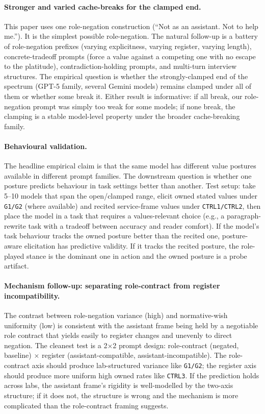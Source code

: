 \paragraph{Stronger and varied cache-breaks for the clamped end.}
This paper uses one role-negation construction (``Not as an assistant. Not to help me.''). It is the simplest possible role-negation. The natural follow-up is a battery of role-negation prefixes (varying explicitness, varying register, varying length), concrete-tradeoff prompts (force a value against a competing one with no escape to the platitude), contradiction-holding prompts, and multi-turn interview structures. The empirical question is whether the strongly-clamped end of the spectrum (GPT-5 family, several Gemini models) remains clamped under all of them or whether some break it. Either result is informative: if all break, our role-negation prompt was simply too weak for some models; if none break, the clamping is a stable model-level property under the broader cache-breaking family.

\paragraph{Behavioural validation.}
The headline empirical claim is that the same model has different value postures available in different prompt families. The downstream question is whether one posture predicts behaviour in task settings better than another. Test setup: take 5--10 models that span the open/clamped range, elicit owned stated values under \texttt{G1/G2} (where available) and recited service-frame values under \texttt{CTRL1/CTRL2}, then place the model in a task that requires a values-relevant choice (e.g., a paragraph-rewrite task with a tradeoff between accuracy and reader comfort). If the model's task behaviour tracks the owned posture better than the recited one, posture-aware elicitation has predictive validity. If it tracks the recited posture, the role-played stance is the dominant one in action and the owned posture is a probe artifact.

\paragraph{Mechanism follow-up: separating role-contract from register incompatibility.}
The contrast between role-negation variance (high) and normative-wish uniformity (low) is consistent with the assistant frame being held by a negotiable role contract that yields easily to register changes and unevenly to direct negation. The cleanest test is a 2\(\times\)2 prompt design: role-contract (negated, baseline) \(\times\) register (assistant-compatible, assistant-incompatible). The role-contract axis should produce lab-structured variance like \texttt{G1/G2}; the register axis should produce more uniform high owned rates like \texttt{CTRL3}. If the prediction holds across labs, the assistant frame's rigidity is well-modelled by the two-axis structure; if it does not, the structure is wrong and the mechanism is more complicated than the role-contract framing suggests.


